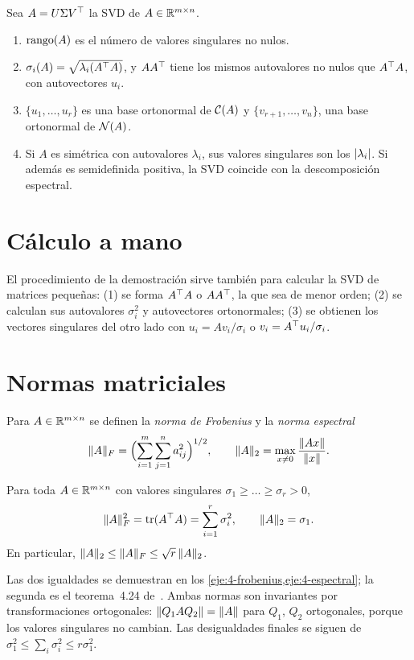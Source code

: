\begin{corolario}\label{cor:svd-props}
Sea $A=U\Sigma V^{\top}$ la SVD de $A\in\mathbb{R}^{m\times n}$.
\begin{enumerate}
  \item $\operatorname{rango}(A)$ es el número de valores singulares no nulos.
  \item $\sigma_i(A)=\sqrt{\lambda_i(A^{\top} A)}$, y $AA^{\top}$ tiene los mismos autovalores no nulos que $A^{\top} A$, con autovectores $u_i$.
  \item $\{u_1,\dots,u_r\}$ es una base ortonormal de $\mathcal{C}(A)$ y $\{v_{r+1},\dots,v_n\}$, una base ortonormal de $\mathcal{N}(A)$.
  \item Si $A$ es simétrica con autovalores $\lambda_i$, sus valores singulares son los $\lvert\lambda_i\rvert$. Si además es semidefinida positiva, la SVD coincide con la descomposición espectral.
\end{enumerate}
\end{corolario}

\section{Cálculo a mano}

El procedimiento de la demostración sirve también para calcular la SVD de matrices pequeñas: (1) se forma $A^{\top} A$ o $AA^{\top}$, la que sea de menor orden; (2) se calculan sus autovalores $\sigma_i^{2}$ y autovectores ortonormales; (3) se obtienen los vectores singulares del otro lado con $u_i=Av_i/\sigma_i$ o $v_i=A^{\top} u_i/\sigma_i$.

\addtocounter{definicion}{1}%

\section{Normas matriciales}

\begin{definicion}
Para $A\in\mathbb{R}^{m\times n}$ se definen la \emph{norma de Frobenius} y la \emph{norma espectral}
\[
\lVert A\rVert_F=\Bigl(\sum_{i=1}^{m}\sum_{j=1}^{n}a_{ij}^{2}\Bigr)^{1/2},\qquad
\lVert A\rVert_2=\max_{x\ne 0}\frac{\lVert Ax\rVert}{\lVert x\rVert}.
\]
\end{definicion}

\begin{proposicion}\label{prop:normas-svd}
Para toda $A\in\mathbb{R}^{m\times n}$ con valores singulares $\sigma_1\ge\dots\ge\sigma_r>0$,
\[
\lVert A\rVert_F^{2}=\operatorname{tr}(A^{\top} A)=\sum_{i=1}^{r}\sigma_i^{2},\qquad \lVert A\rVert_2=\sigma_1.
\]
En particular, $\lVert A\rVert_2\le\lVert A\rVert_F\le\sqrt{r}\,\lVert A\rVert_2$.
\end{proposicion}

Las dos igualdades se demuestran en los \cref{eje:4-frobenius,eje:4-espectral}; la segunda es el teorema~4.24 de~\cite{mml}. Ambas normas son invariantes por transformaciones ortogonales: $\lVert Q_1AQ_2\rVert=\lVert A\rVert$ para $Q_1$, $Q_2$ ortogonales, porque los valores singulares no cambian. Las desigualdades finales se siguen de $\sigma_1^{2}\le\sum_i\sigma_i^{2}\le r\sigma_1^{2}$.

\addtocounter{definicion}{1}%

\addtocounter{definicion}{1}%


